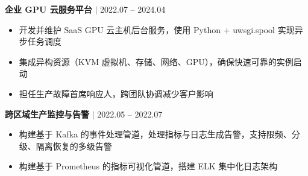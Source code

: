 \documentclass[10pt, a4paper]{article}
\newcommand{\entry}[3]{
  \vspace{0.3em}
  \noindent\textbf{#1} \hfill {\color{gray}\small #2 $\mid$ #3}\newline
}
\begin{document}
\entry{企业 GPU 云服务平台}{}{2022.07 -- 2024.04}
\begin{itemize}
  \item 开发并维护 SaaS GPU 云主机后台服务，使用 Python + uwsgi.spool 实现异步任务调度
  \item 集成异构资源（KVM 虚拟机、存储、网络、GPU），确保快速可靠的实例启动
  \item 担任生产故障首席响应人，跨团队协调减少客户影响
\end{itemize}

\entry{跨区域生产监控与告警}{}{2022.05 -- 2022.07}
\begin{itemize}
  \item 构建基于 Kafka 的事件处理管道，处理指标与日志生成告警，支持限频、分级、隔离恢复的多级告警
  \item 构建基于 Prometheus 的指标可视化管道，搭建 ELK 集中化日志架构
\end{itemize}
\end{document}

